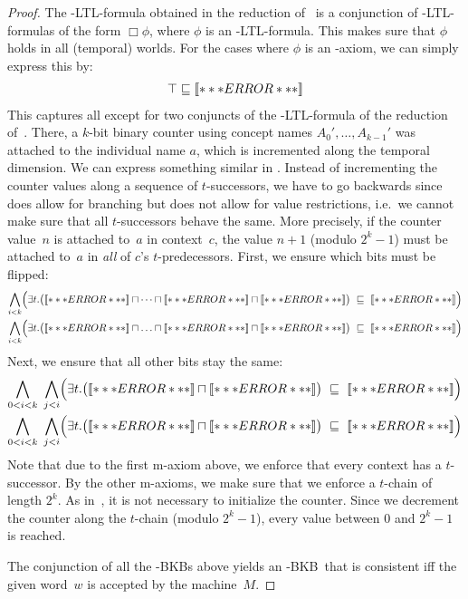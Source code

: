 \begin{proof}
  The \ALC-LTL-formula obtained in the reduction of~\cite{BaGL-KR08,BaGL-ToCL12} is a conjunction of
  \ALC-LTL-formulas of the form $\Box\phi$, where $\phi$ is an \ALC-LTL-formula.  This makes sure
  that $\phi$ holds in all (temporal) worlds.  For the cases where $\phi$ is an \ALC-axiom, we can
  simply express this by:
  \begin{gather*}
    \top\sqsubseteq\oax{\phi}
  \end{gather*}
  This captures all except for two conjuncts of the \ALC-LTL-formula of the reduction
  of~\cite{BaGL-KR08,BaGL-ToCL12}.  There, a $k$-bit binary counter using concept names
  $A_0',\dots,A_{k-1}'$ was attached to the individual name $a$, which is incremented along the
  temporal dimension.  We can express something similar in \ELALC. Instead of incrementing the
  counter values along a sequence of $t$-successors, we have to go backwards since \EL does allow
  for branching but does not allow for value restrictions, i.e.~we cannot make sure that all
  $t$-successors behave the same.  More precisely, if the counter value~$n$ is attached to~$a$ in
  context~$c$, the value $n+1$ (modulo $2^k-1$) must be attached to~$a$ in \emph{all} of $c$'s
  $t$-predecessors.
  First, we ensure which bits must be flipped:
  \begin{align*}
    \bigwedge_{i<k} \Bigl( \exists t.\bigl(\oax{A_{0}'(a)} \sqcap \dots \sqcap \oax{A_{i-1}'(a)} \sqcap \oax{A_{i}'(a)}\bigr)
    & \ \sqsubseteq\ \oax{(\lnot A_{i}')(a)}\Bigr)\\ 
    \bigwedge_{i<k}\Bigl( \exists t.\bigl(\oax{A_{0}'(a)}\sqcap\ldots\sqcap \oax{A_{i-1}'(a)} \sqcap \oax{(\lnot A_{i}')(a)}\bigr)
    & \ \sqsubseteq\ \oax{A_{i}'(a)}\Bigr)
  \end{align*}
  Next, we ensure that all other bits stay the same:
  \begin{align*}
    \bigwedge_{0<i<k}\ \bigwedge_{j<i}\Bigl(\exists t.\bigl(\oax{(\lnot A_{j}')(a)}\sqcap\oax{A_{i}'(a)}\bigr)
    & \ \sqsubseteq\ \oax{A_{i}'(a)}\Bigr)\\
    \bigwedge_{0<i<k}\ \bigwedge_{j<i}\Bigl(\exists t.\bigl(\oax{(\lnot A_{j}')(a)}\sqcap\oax{(\lnot A_{i}')(a)}\bigr)
    & \ \sqsubseteq\ \oax{(\lnot A_{i}')(a)}\Bigr)
  \end{align*}
  Note that due to the first m-axiom above, we enforce that every context has a $t$-successor.  By
  the other m-axioms, we make sure that we enforce a $t$-chain of length $2^k$.
  As in~\cite{BaGL-KR08,BaGL-ToCL12}, it is not necessary to initialize the counter.  Since we
  decrement the counter along the $t$-chain (modulo $2^k-1$), every value between $0$ and $2^k-1$
  is reached.
  
  The conjunction of all the \ELALC-BKBs above yields an \ELALC-BKB~\Bmc that is consistent iff the
  given word~$w$
  is accepted by the machine~$M$.
\end{proof}

